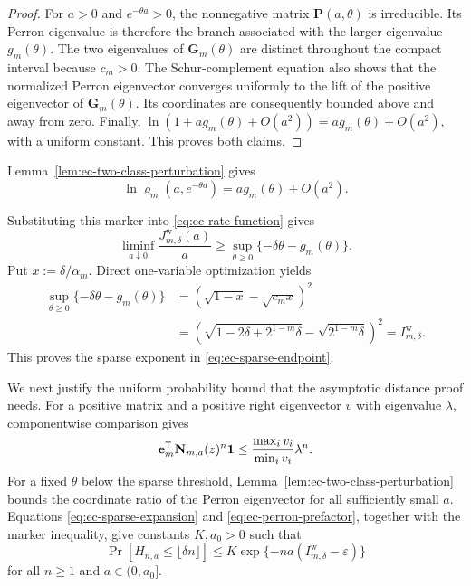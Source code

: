 \begin{proof}
For $a>0$ and $e^{-\theta a}>0$, the nonnegative matrix
$\mathbf P(a,\theta)$ is irreducible.  Its Perron eigenvalue is therefore the
branch associated with the larger eigenvalue $g_m(\theta)$.  The two
eigenvalues of $\mathbf G_m(\theta)$ are distinct throughout the compact
interval because $c_m>0$.  The Schur-complement equation also shows that the
normalized Perron eigenvector converges uniformly to the lift of the positive
eigenvector of $\mathbf G_m(\theta)$.  Its coordinates are consequently
bounded above and away from zero.  Finally,
$\ln(1+a g_m(\theta)+O(a^2))=a g_m(\theta)+O(a^2)$, with a uniform constant.
This proves both claims.
\end{proof}

Lemma~\ref{lem:ec-two-class-perturbation} gives
\begin{equation}
 \ln\varrho_m(a,e^{-\theta a})
 =a g_m(\theta)+O(a^2).
 \label{eq:ec-sparse-expansion}
\end{equation}

Substituting this marker into \eqref{eq:ec-rate-function} gives
\begin{equation}
 \liminf_{a\downarrow0}\frac{J^{\mathrm w}_{m,\delta}(a)}a
 \geq\sup_{\theta\geq0}\{-\delta\theta-g_m(\theta)\}.
 \label{eq:ec-effective-optimization}
\end{equation}
Put $x:=\delta/\alpha_m$.  Direct one-variable optimization yields
\begin{align}
 \sup_{\theta\geq0}\{-\delta\theta-g_m(\theta)\}
 &=\left(\sqrt{1-x}-\sqrt{c_mx}\right)^2\\
 &=\left(
 \sqrt{1-2\delta+2^{1-m}\delta}
 -\sqrt{2^{1-m}\delta}
 \right)^2
 =I^{\mathrm w}_{m,\delta}.
 \label{eq:ec-effective-rate}
\end{align}
This proves the sparse exponent in \eqref{eq:ec-sparse-endpoint}.

We next justify the uniform probability bound that the asymptotic distance
proof needs.  For a positive matrix and a positive right eigenvector $v$ with
eigenvalue $\lambda$, componentwise comparison gives
\begin{equation}
 \mathbf e_m^{\mathsf T}\mathbf N_{m,a}(z)^n\mathbf 1
 \leq \frac{\max_i v_i}{\min_i v_i}\lambda^n.
 \label{eq:ec-perron-prefactor}
\end{equation}
For a fixed $\theta$ below the sparse threshold,
Lemma~\ref{lem:ec-two-class-perturbation} bounds the coordinate ratio of the
Perron eigenvector for all sufficiently small $a$.  Equations
\eqref{eq:ec-sparse-expansion} and \eqref{eq:ec-perron-prefactor}, together
with the marker inequality, give constants $K,a_0>0$ such that
\begin{equation}
 \Pr[H_{n,a}\leq\lfloor\delta n\rfloor]
 \leq K\exp\{-na(I^{\mathrm w}_{m,\delta}-\varepsilon)\}
 \label{eq:ec-uniform-sparse-tail}
\end{equation}
for all $n\geq1$ and $a\in(0,a_0]$.

